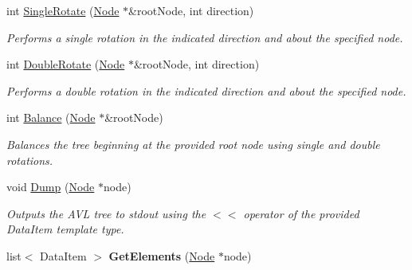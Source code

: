\begin{DoxyCompactItemize}
\item 
int \hyperlink{classAVLTree_ac7ebd1be164c8e1d0eab990e14285957}{Single\-Rotate} (\hyperlink{structAVLTree_1_1Node}{Node} $\ast$\&root\-Node, int direction)
\begin{DoxyCompactList}\small\item\em Performs a single rotation in the indicated direction and about the specified node. \end{DoxyCompactList}\item 
int \hyperlink{classAVLTree_a7e2ed1a8d70f97fc9d4de6d9da4eb729}{Double\-Rotate} (\hyperlink{structAVLTree_1_1Node}{Node} $\ast$\&root\-Node, int direction)
\begin{DoxyCompactList}\small\item\em Performs a double rotation in the indicated direction and about the specified node. \end{DoxyCompactList}\item 
int \hyperlink{classAVLTree_aabcb2e90d12bcb172f728692bce7e7be}{Balance} (\hyperlink{structAVLTree_1_1Node}{Node} $\ast$\&root\-Node)
\begin{DoxyCompactList}\small\item\em Balances the tree beginning at the provided root node using single and double rotations. \end{DoxyCompactList}\item 
void \hyperlink{classAVLTree_aeafa2839058227c9a076d56d7929ebf7}{Dump} (\hyperlink{structAVLTree_1_1Node}{Node} $\ast$node)
\begin{DoxyCompactList}\small\item\em Outputs the A\-V\-L tree to stdout using the $<$$<$ operator of the provided Data\-Item template type. \end{DoxyCompactList}\item 
\hypertarget{classAVLTree_ad02b6a7bd1582dba503d48a8b960d902}{list$<$ Data\-Item $>$ {\bfseries Get\-Elements} (\hyperlink{structAVLTree_1_1Node}{Node} $\ast$node)}\label{classAVLTree_ad02b6a7bd1582dba503d48a8b960d902}


\end{DoxyCompactItemize}
